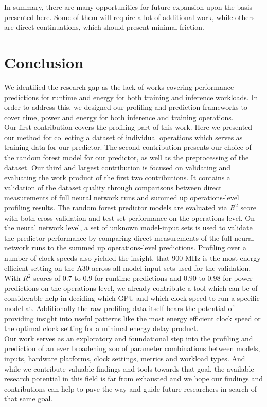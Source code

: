In summary, there are many opportunities for future expansion upon the basis presented here. Some of them will require a lot of additional work, while others are direct continuations, which should present minimal friction.

\section{Conclusion}


We identified the research gap as the lack of works covering performance predictions for runtime and energy for both training and inference workloads. In order to address this, we designed our profiling and prediction frameworks to cover time, power and energy for both inference and training operations. \\
Our first contribution covers the profiling part of this work. Here we presented our method for collecting a dataset of individual operations which serves as training data for our predictor. The second contribution presents our choice of the random forest model for our predictor, as well as the preprocessing of the dataset. Our third and largest contribution is focused on validating and evaluating the work product of the first two contributions. It contains a validation of the dataset quality through comparisons between direct measurements of full neural network runs and summed up operations-level profiling results. The random forest predictor models are evaluated via $R^2$ score with both cross-validation and test set performance on the operations level. On the neural network level, a set of unknown model-input sets is used to validate the predictor performance by comparing direct measurements of the full neural network runs to the summed up operations-level predictions. Profiling over a number of clock speeds also yielded the insight, that 900 MHz is the most energy efficient setting on the A30 across all model-input sets used for the validation. \\
With $R^2$ scores of $0.7$ to $0.9$ for runtime predictions and $0.90$ to $0.98$ for power predictions on the operations level, we already contribute a tool which can be of considerable help in deciding which GPU and which clock speed to run a specific model at. Additionally the raw profiling data itself bears the potential of providing insight into useful patterns like the most energy efficient clock speed or the optimal clock setting for a minimal energy delay product. \\
Our work serves as an exploratory and foundational step into the profiling and prediction of an ever broadening zoo of parameter combinations between models, inputs, hardware platforms, clock settings, metrics and workload types. And while we contribute valuable findings and tools towards that goal, the available research potential in this field is far from exhausted and we hope our findings and contributions can help to pave the way and guide future researchers in search of that same goal.